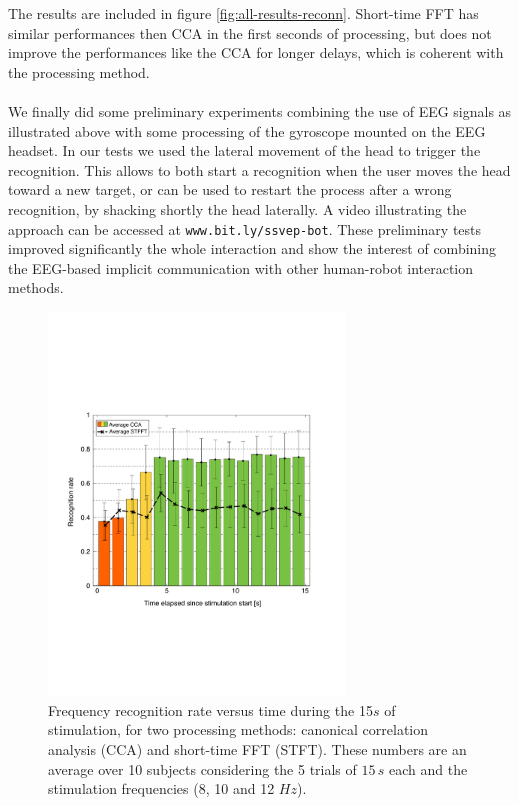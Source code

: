 \documentclass[smallextended]{svjour3}
\begin{document}
The results are included in figure \ref{fig:all-results-reconn}. Short-time FFT has similar performances then CCA in the first seconds of processing, but does not improve the performances like the CCA for longer delays, which is coherent with the processing method. \\
\\
We finally did some preliminary experiments combining the use of EEG signals as illustrated above with some processing of the gyroscope mounted on the EEG headset. In our tests we used the lateral movement of the head to trigger the recognition. This allows to both start a recognition when the user moves the head toward a new target, or can be used to restart the process after a wrong recognition, by shacking shortly the head laterally. A video illustrating the approach can be accessed at \verb"www.bit.ly/ssvep-bot". These preliminary tests improved significantly the whole interaction and show the interest of combining the EEG-based implicit communication with other human-robot interaction methods.

\begin{figure}
\center
\includegraphics[width=0.7\textwidth]{figures/all_time_reconn.pdf}
\caption{Frequency recognition rate versus time during the 15$s$ of stimulation, for two processing methods: canonical correlation analysis (CCA) and short-time FFT (STFT). These numbers are an average over 10 subjects considering the 5 trials of $15\,s$ each and the stimulation frequencies (8, 10 and 12 $Hz$).} \label{fig:all_time_reconn}
\end{figure}
\end{document}
